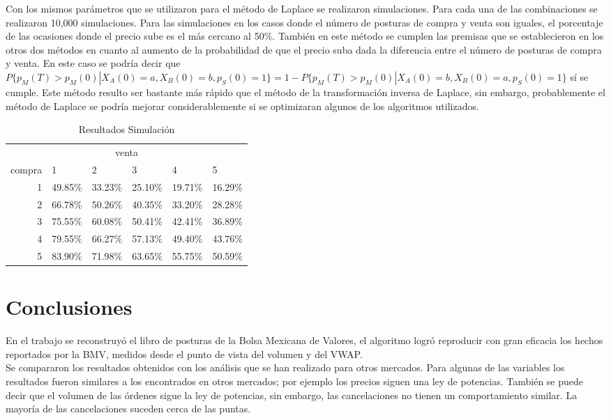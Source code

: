 \documentclass[11pt]{article}
\numberwithin{equation}{section} %
\begin{document}
Con los mismos parámetros que se utilizaron para el método de Laplace se realizaron simulaciones. Para cada una de las combinaciones se realizaron 10,000 simulaciones. Para las simulaciones en los casos donde el número de posturas de compra y venta son iguales, el porcentaje de las ocasiones donde el precio sube es el más cercano al 50\%. También en este método se cumplen las premisas que se establecieron en los otros dos métodos en cuanto al aumento de la probabilidad de que el precio suba dada la diferencia entre el número de posturas de compra y venta. En este caso se podría decir que $P\{p_M(T)>p_M(0)|X_A(0)=a,X_B(0)=b,p_S(0)=1\}=1-P\{p_M(T)>p_M(0)|X_A(0)=b,X_B(0)=a,p_S(0)=1\}$ sí se cumple. Este método resulto ser bastante más rápido que el método de la transformación inversa de Laplace, sin embargo, probablemente el método de Laplace se podría mejorar considerablemente si se optimizaran algunos de los algoritmos utilizados.

\begin{table}[htbp]
\centering
\caption{Resultados Simulación}
\begin{tabular}{r|p{1.5cm}|p{1.5cm}|p{1.5cm}|p{1.5cm}|p{1.5cm}|}
\multicolumn{6}{c}{venta}\\
\cline{2-6}
compra & 1& 2 & 3 & 4 & 5 \\
\cline{2-6}
1 & 49.85\% & 33.23\% & 25.10\% & 19.71\% & 16.29\% \\
2 & 66.78\% & 50.26\% & 40.35\% & 33.20\% & 28.28\% \\
3 & 75.55\% & 60.08\% & 50.41\% & 42.41\% & 36.89\% \\
4 & 79.55\% & 66.27\% & 57.13\% & 49.40\% & 43.76\% \\
5 & 83.90\% & 71.98\% & 63.65\% & 55.75\% & 50.59\% \\
\cline{2-6}
\end{tabular}%
\label{tab:ressim}%
\end{table}%

\clearpage

\section{Conclusiones}

En el trabajo se reconstruyó el libro de posturas de la Bolsa Mexicana de Valores, el algoritmo logró reproducir con gran eficacia los hechos reportados por la BMV, medidos desde el punto de vista del volumen y del VWAP.\\

Se compararon los resultados obtenidos con los análisis que se han realizado para otros mercados. Para algunas de las variables los resultados fueron similares a los encontrados en otros mercados; por ejemplo los precios siguen una ley de potencias. También se puede decir que el volumen de las órdenes sigue la ley de potencias, sin embargo, las cancelaciones no tienen un comportamiento similar. La mayoría de las cancelaciones suceden cerca de las puntas.\\
\end{document}
